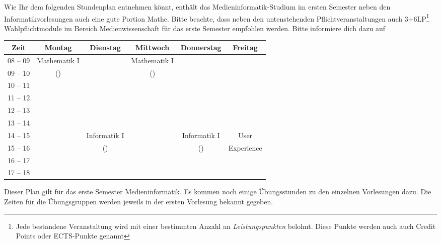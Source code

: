 
Wie Ihr dem folgenden Stundenplan entnehmen könnt, enthält das Medieninformatik-Studium im ersten
Semester neben den Informatikvorlesungen auch eine gute Portion Mathe. Bitte beachte, dass neben den untenstehenden Pflichtveranstaltungen auch 3+6LP\footnote{Jede bestandene Veranstaltung wird mit einer bestimmten Anzahl an \emph{Leistungspunkten} belohnt. Diese Punkte werden auch auch Credit Points oder ECTS-Punkte genannt} Wahlpflichtmodule im Bereich Medienwissenschaft für das erste Semester empfohlen werden. Bitte informiere dich dazu auf \\
\noindent{}

\begin{minipage}{\textwidth}
    \footnotesize
\begin{center}
	\begin{tabular}{|c|c|c|c|c|c|}
	\hline
	 Zeit     &    Montag      	& Dienstag    	& Mittwoch    	& Donnerstag 		& Freitag 	\\ \hline\hline
	 08 -- 09 &    Mathematik I	&             	& Mathematik I	& 					&  			\\ \cline{1-1} \cline{3-3} \cline{5-6}
	 09 -- 10 &    (\Matheprof)	&             	& (\Matheprof)	& 					&  			\\ \hline
	 10 -- 11 &                	&             	&             	& 					&  			\\ \hline
	 11 -- 12 &                	&             	&             	& 					&  			\\ \hline
	 12 -- 13 &                	&             	&             	& 					&  			\\ \hline
	 13 -- 14 &                	&             	&             	& 					&  			\\ \hline
	 14 -- 15 &                	& Informatik I	&             	& Informatik I 		&  User		\\ \cline{1-2} \cline{4-4}
	 15 -- 16 &                	& (\Infoprof) 	&             	& (\Infoprof) 		&  Experience\\ \hline
	 16 -- 17 &                	&             	&             	& 					&  			\\ \hline
	 17 -- 18 &                	&             	&             	& 					&  			\\ \hline
	\end{tabular}

\end{center}
\end{minipage}

Dieser Plan gilt für das erste Semester Medieninformatik. 
Es kommen noch einige Übungsstunden zu den einzelnen Vorlesungen dazu. Die Zeiten für die Übungsgruppen werden jeweils in der ersten Vorlesung bekannt gegeben.
